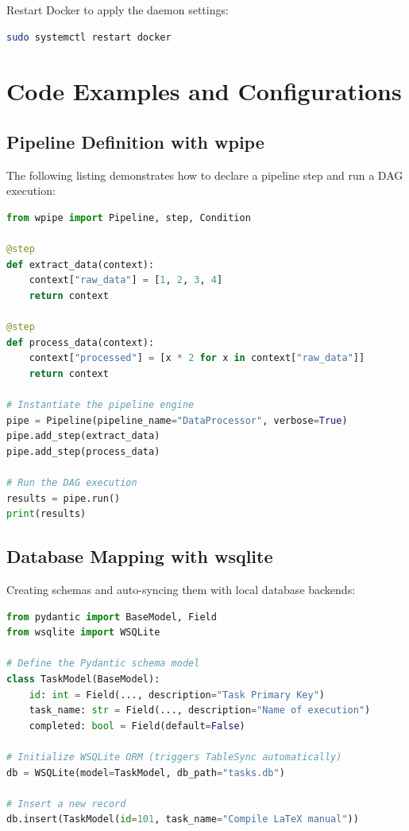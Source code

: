 \documentclass[12pt,a4paper]{report}
\begin{document}
Restart Docker to apply the daemon settings:
\begin{lstlisting}[language=bash, caption={Restarting Docker daemon}]
sudo systemctl restart docker
\end{lstlisting}

\cleardoublepage
\chapter{Code Examples and Configurations}

\section{\sffamily Pipeline Definition with wpipe}
The following listing demonstrates how to declare a pipeline step and run a DAG execution:

\begin{lstlisting}[language=Python, caption={Pipeline configuration using wpipe}]
from wpipe import Pipeline, step, Condition

@step
def extract_data(context):
    context["raw_data"] = [1, 2, 3, 4]
    return context

@step
def process_data(context):
    context["processed"] = [x * 2 for x in context["raw_data"]]
    return context

# Instantiate the pipeline engine
pipe = Pipeline(pipeline_name="DataProcessor", verbose=True)
pipe.add_step(extract_data)
pipe.add_step(process_data)

# Run the DAG execution
results = pipe.run()
print(results)
\end{lstlisting}

\section{\sffamily Database Mapping with wsqlite}
Creating schemas and auto-syncing them with local database backends:

\begin{lstlisting}[language=Python, caption={Pydantic model and SQLite Sync with wsqlite}]
from pydantic import BaseModel, Field
from wsqlite import WSQLite

# Define the Pydantic schema model
class TaskModel(BaseModel):
    id: int = Field(..., description="Task Primary Key")
    task_name: str = Field(..., description="Name of execution")
    completed: bool = Field(default=False)

# Initialize WSQLite ORM (triggers TableSync automatically)
db = WSQLite(model=TaskModel, db_path="tasks.db")

# Insert a new record
db.insert(TaskModel(id=101, task_name="Compile LaTeX manual"))
\end{lstlisting}
\end{document}

